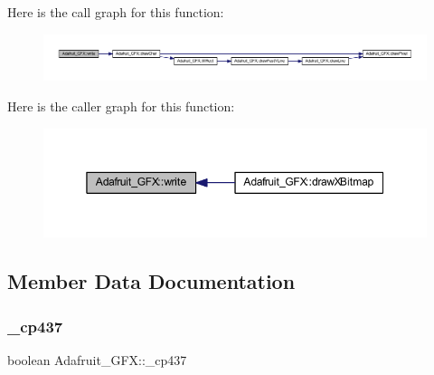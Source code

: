 Here is the call graph for this function\+:
\nopagebreak
\begin{figure}[H]
\begin{center}
\leavevmode
\includegraphics[width=350pt]{d9/d97/class_adafruit___g_f_x_af4978ea0cf0c0b0540567e82d8fa9900_cgraph}
\end{center}
\end{figure}
Here is the caller graph for this function\+:
\nopagebreak
\begin{figure}[H]
\begin{center}
\leavevmode
\includegraphics[width=350pt]{d9/d97/class_adafruit___g_f_x_af4978ea0cf0c0b0540567e82d8fa9900_icgraph}
\end{center}
\end{figure}


\subsection{Member Data Documentation}
\mbox{\label{class_adafruit___g_f_x_aaef3d4d239641084cd3825a8b1042e01}} 
\subsubsection{\texorpdfstring{\+\_\+cp437}{\_cp437}}
{\footnotesize\ttfamily boolean Adafruit\+\_\+\+G\+F\+X\+::\+\_\+cp437\hspace{0.3cm}{\ttfamily [protected]}}

\mbox{\label{class_adafruit___g_f_x_ab9bb0cbc2455f64dce2a5ec36307aa94}} 
